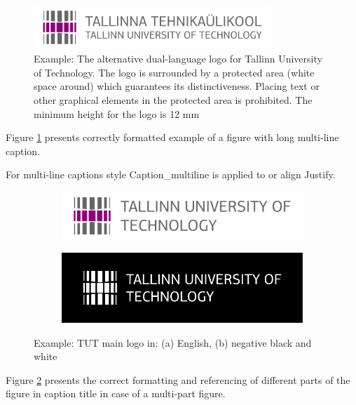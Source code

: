 \begin{figure}[!ht]
  \centering
  \includegraphics[width=0.8\textwidth]{figures/TTU_alternatiivne_logo_EST_ENG_print}
  \caption{Example: The alternative dual-language logo for Tallinn
    University of Technology. The logo is surrounded by a protected area
    (white space around) which guarantees its distinctiveness. Placing
    text or other graphical elements in the protected area is
    prohibited. The minimum height for the logo is 12 mm}
  \label{fig:logo2}
\end{figure}

Figure \ref{fig:logo2} presents correctly formatted example of a figure with long multi-line caption.


For multi-line captions style Caption\_multiline is applied to or align Justify.

\begin{figure}[!ht]
  \centering
  \begin{subfigure}[b]{0.45\textwidth}
    \includegraphics[width=\textwidth]{figures/TTU_peamine_logo_ENG_print}
    \caption{}
  \end{subfigure}
  \qquad
  \begin{subfigure}[b]{0.45\textwidth}
    \includegraphics[width=\textwidth]{figures/ttu_peamine_logo_eng_must-valge_negatiivis}
    \caption{}
  \end{subfigure}
  \caption{Example: TUT main logo in: (a) English, (b) negative black and white}
  \label{fig:logo3}
\end{figure}

Figure \ref{fig:logo3} presents the correct formatting and referencing
of different parts of the figure in caption title in case of a
multi-part figure.


